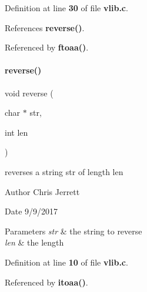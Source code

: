 Definition at line \textbf{ 30} of file \textbf{ vlib.\+c}.



References \textbf{ reverse()}.



Referenced by \textbf{ ftoaa()}.

\mbox{\label{vlib_8c_aad7fea725cb4b198ace1aa3df5051244}} 
\paragraph{reverse()}
{\footnotesize\ttfamily void reverse (\begin{DoxyParamCaption}\item[{char $\ast$}]{str,  }\item[{int}]{len }\end{DoxyParamCaption})}



reverses a string \textquotesingle{}str\textquotesingle{} of length \textquotesingle{}len\textquotesingle{} 

\begin{DoxyAuthor}{Author}
Chris Jerrett 
\end{DoxyAuthor}
\begin{DoxyDate}{Date}
9/9/2017 
\end{DoxyDate}

\begin{DoxyParams}{Parameters}
{\em str} & the string to reverse \\
\hline
{\em len} & the length \\
\hline
\end{DoxyParams}


Definition at line \textbf{ 10} of file \textbf{ vlib.\+c}.



Referenced by \textbf{ itoaa()}.

